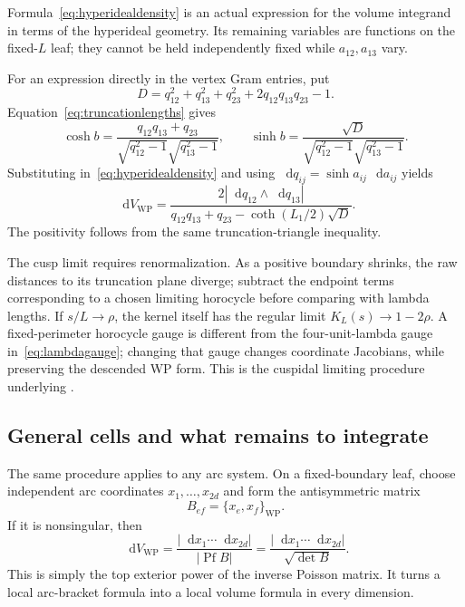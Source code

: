 \documentclass[11pt,a4paper]{article}
\numberwithin{equation}{section}
\theoremstyle{definition}
\theoremstyle{remark}
\DeclareMathOperator{\Pf}{Pf}
\newcommand{\dd}{\mathop{}\!\mathrm d}
\newcommand{\WP}{\mathrm{WP}}
\newcommand{\dV}{\dd V_{\WP}}
\newcommand{\abs}[1]{\left|#1\right|}
\begin{document}
Formula~\eqref{eq:hyperidealdensity} is an actual expression for the volume
integrand in terms of the hyperideal geometry. Its remaining variables are
functions on the fixed-$L$ leaf; they cannot be held independently fixed
while $a_{12},a_{13}$ vary.

For an expression directly in the vertex Gram entries, put
\[
 D=q_{12}^2+q_{13}^2+q_{23}^2+2q_{12}q_{13}q_{23}-1.
\]
Equation~\eqref{eq:truncationlengths} gives
\[
 \cosh b=\frac{q_{12}q_{13}+q_{23}}
                   {\sqrt{q_{12}^2-1}\sqrt{q_{13}^2-1}},\qquad
 \sinh b=\frac{\sqrt D}
                   {\sqrt{q_{12}^2-1}\sqrt{q_{13}^2-1}}.
\]
Substituting in~\eqref{eq:hyperidealdensity} and using
$\dd q_{ij}=\sinh a_{ij}\,\dd a_{ij}$ yields
\begin{equation}
 \boxed{
 \dV=
 \frac{2\abs{\dd q_{12}\wedge\dd q_{13}}}
 {q_{12}q_{13}+q_{23}-\coth(L_1/2)\sqrt D}.}
 \label{eq:gramdensity}
\end{equation}
The positivity follows from the same truncation-triangle inequality.

The cusp limit requires renormalization. As a positive boundary shrinks,
the raw distances to its truncation plane diverge; subtract the endpoint
terms corresponding to a chosen limiting horocycle before comparing with
lambda lengths. If $s/L\to\rho$, the kernel itself has the regular limit
$K_L(s)\to1-2\rho$. A fixed-perimeter horocycle gauge is different from
the four-unit-lambda gauge in~\eqref{eq:lambdagauge}; changing that gauge
changes coordinate Jacobians, while preserving the descended WP form.
This is the cuspidal limiting procedure underlying
\cite[Theorem 4.5]{MondelloBoundary}.

\subsection{General cells and what remains to integrate}

The same procedure applies to any arc system. On a fixed-boundary leaf,
choose independent arc coordinates $x_1,\ldots,x_{2d}$ and form the
antisymmetric matrix
\[
 B_{ef}=\{x_e,x_f\}_{\WP}.
\]
If it is nonsingular, then
\begin{equation}
 \boxed{
 \dV=\frac{|\dd x_1\cdots\dd x_{2d}|}{|\Pf B|}
       =\frac{|\dd x_1\cdots\dd x_{2d}|}{\sqrt{\det B}}.}
 \label{eq:pfaffiandensity}
\end{equation}
This is simply the top exterior power of the inverse Poisson matrix. It
turns a local arc-bracket formula into a local volume formula in every
dimension.
\end{document}
